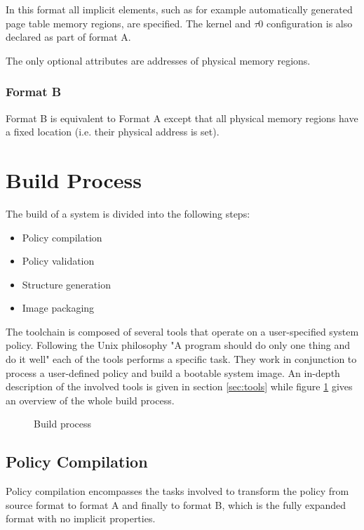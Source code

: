 \documentclass[a4paper,twoside,titlepage]{article}
\begin{document}
In this format all implicit elements, such as for example automatically
generated page table memory regions, are specified. The kernel and $\tau$0
configuration is also declared as part of format A.

The only optional attributes are addresses of physical memory regions.

\subsubsection{Format B}
Format B is equivalent to Format A except that all physical memory regions have
a fixed location (i.e. their physical address is set).

\section{Build Process}
The build of a system is divided into the following steps:

\begin{itemize}
	\item Policy compilation
	\item Policy validation
	\item Structure generation
	\item Image packaging
\end{itemize}

The toolchain is composed of several tools that operate on a user-specified
system policy. Following the Unix philosophy "A program should do only one thing
and do it well" each of the tools performs a specific task. They work in
conjunction to process a user-defined policy and build a bootable system image.
An in-depth description of the involved tools is given in section
\ref{sec:tools} while figure \ref{fig:build-process} gives an overview of the
whole build process.

\begin{figure}[h]
	\centering
	
	\caption{Build process}
	\label{fig:build-process}
\end{figure}

\subsection{Policy Compilation}
\label{sec:build-policy_compilation}
Policy compilation encompasses the tasks involved to transform the policy from
source format to format A and finally to format B, which is the fully expanded
format with no implicit properties.
\end{document}
